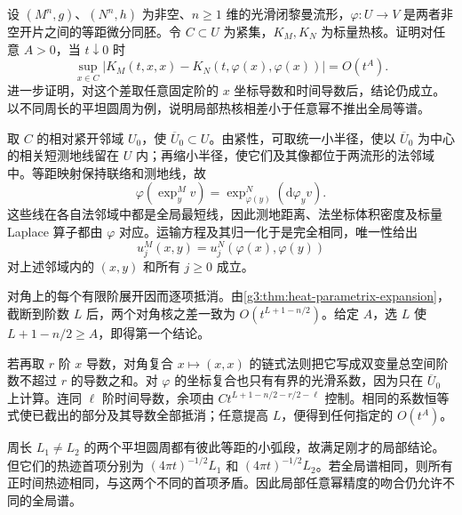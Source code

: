 \begin{exercise}\label{g3:ex:heat-locality-to-all-orders}
	设 \((M^n,g)\)、\((N^n,h)\) 为非空、\(n\ge1\) 维的光滑闭黎曼流形，\(\varphi:U\to V\) 是两者非空开片之间的等距微分同胚。令 \(C\subset U\) 为紧集，\(K_M,K_N\) 为标量热核。证明对任意 \(A>0\)，当 \(t\downarrow0\) 时
	\[
		\sup_{x\in C}|K_M(t,x,x)-K_N(t,\varphi(x),\varphi(x))|=O(t^A).
	\]
	进一步证明，对这个差取任意固定阶的 \(x\) 坐标导数和时间导数后，结论仍成立。以不同周长的平坦圆周为例，说明局部热核相差小于任意幂不推出全局等谱。
\end{exercise}
\begin{solution}
	取 \(C\) 的相对紧开邻域 \(U_0\)，使 \(\overline U_0\subset U\)。由紧性，可取统一小半径，使以 \(\overline U_0\) 为中心的相关短测地线留在 \(U\) 内；再缩小半径，使它们及其像都位于两流形的法邻域中。等距映射保持联络和测地线，故
	\[
		\varphi(\exp_y^M v)=\exp_{\varphi(y)}^N(\mathrm d\varphi_yv).
	\]
	这些线在各自法邻域中都是全局最短线，因此测地距离、法坐标体积密度及标量 Laplace 算子都由 \(\varphi\) 对应。运输方程及其归一化于是完全相同，唯一性给出
	\[
		u_j^M(x,y)=u_j^N(\varphi(x),\varphi(y))
	\]
	对上述邻域内的 \((x,y)\) 和所有 \(j\ge0\) 成立。

	对角上的每个有限阶展开因而逐项抵消。由\cref{g3:thm:heat-parametrix-expansion}，截断到阶数 \(L\) 后，两个对角核之差一致为 \(O(t^{L+1-n/2})\)。给定 \(A\)，选 \(L\) 使 \(L+1-n/2\ge A\)，即得第一个结论。

	若再取 \(r\) 阶 \(x\) 导数，对角复合 \(x\mapsto(x,x)\) 的链式法则把它写成双变量总空间阶数不超过 \(r\) 的导数之和。对 \(\varphi\) 的坐标复合也只有有界的光滑系数，因为只在 \(\overline U_0\) 上计算。连同 \(\ell\) 阶时间导数，余项由
	\(Ct^{L+1-n/2-r/2-\ell}\) 控制。相同的系数恒等式使已截出的部分及其导数全部抵消；任意提高 \(L\)，便得到任何指定的 \(O(t^A)\)。

	周长 \(L_1\ne L_2\) 的两个平坦圆周都有彼此等距的小弧段，故满足刚才的局部结论。但它们的热迹首项分别为 \((4\pi t)^{-1/2}L_1\) 和 \((4\pi t)^{-1/2}L_2\)。若全局谱相同，则所有正时间热迹相同，与这两个不同的首项矛盾。因此局部任意幂精度的吻合仍允许不同的全局谱。
\end{solution}

